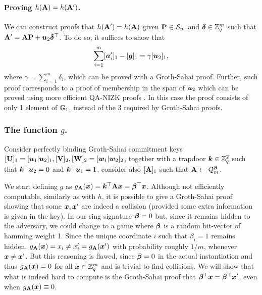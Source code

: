 \paragraph{Proving $h(\mathbf{{A}})=h(\mathbf{{A}}')$.} We can construct proofs that $h(\mathbf{{A}}') = h(\mathbf{{A}})$ given $\mathbf{{P}}\in\mathcal{S}_m$ and ${\boldsymbol{\delta}}\in\mathbb{Z}_q^m$ such that $\mathbf{{A}}' = \mathbf{{A}}\mathbf{{P}}+{\boldsymbol{u}}_2{\boldsymbol{\delta}}^\top$. To do so, it suffices to show that
\begin{equation}
\sum_{i=1}^{m}[{\boldsymbol{a}}'_i]_1 - [{\boldsymbol{g}}]_1 = \gamma[{\boldsymbol{u}}_2]_1,
\label{eq:coll-h}
\end{equation}
where $\gamma = \sum_{i=1}^m \delta_i$,
which can be proved with a Groth-Sahai proof. Further, such proof corresponds to a proof of membership in the span of ${\boldsymbol{u}}_2$ which can be proved using more efficient QA-NIZK proofs \cite{C:JutRoy14,EC:KilWee15}. In this case the proof consists of only 1 element of $\mathbb{G}_1$, instead of the $3$ required by Groth-Sahai proofs.

\subsubsection{The function $g$.} Consider perfectly binding Groth-Sahai commitment keys $[\mathbf{{U}}]_1=[{\boldsymbol{u}}_1|{\boldsymbol{u}}_2]_1,[\mathbf{{V}}]_2,[\mathbf{{W}}]_2 = [{\boldsymbol{w}}_1|{\boldsymbol{w}}_2]_2$, together with a trapdoor ${\boldsymbol{k}}\in\mathbb{Z}_q^2$ such that ${\boldsymbol{k}}^\top{\boldsymbol{u}}_2=0$ and ${\boldsymbol{k}}^\top{\boldsymbol{u}}_1=1$, consider also $[\mathbf{{A}}]_1$ such that $\mathbf{{A}}\gets\mathcal{Q}_m^{\boldsymbol{\beta}}$.

We start defining $g$ as $g_{\mathbf{{A}}}({\boldsymbol{x}}) = {\boldsymbol{k}}^\top\mathbf{{A}}{\boldsymbol{x}} = {\boldsymbol{\beta}}^\top{\boldsymbol{x}}$. Although not efficiently computable, similarly as with $h$, it is possible to give a Groth-Sahai proof showing that some ${\boldsymbol{x}},{\boldsymbol{x}}'$ are indeed a collision (provided some extra information is given in the key).
In our ring signature ${\boldsymbol{\beta}}=0$ but, since it remains hidden to the adversary, we could change to a game where ${\boldsymbol{\beta}}$ is a random bit-vector of hamming weight 1. Since the unique coordinate $i$ such that $\beta_i=1$ remains hidden, $g_{\mathbf{{A}}}({\boldsymbol{x}}) = x_i \neq x'_i =g_{\mathbf{{A}}}({\boldsymbol{x}}')$ with probability roughly $1/m$, whenever ${\boldsymbol{x}}\neq{\boldsymbol{x}}'$. But this reasoning is flawed, since ${\boldsymbol{\beta}}=0$ in the actual instantiation and thus $g_{\mathbf{{A}}}({\boldsymbol{x}}) = 0$ for all ${\boldsymbol{x}}\in\mathbb{Z}_q^m$ and is trivial to find collisions.
We will show that what is indeed hard to compute is the Groth-Sahai proof that ${\boldsymbol{\beta}}^\top{\boldsymbol{x}} = {\boldsymbol{\beta}}^\top{\boldsymbol{x}}'$, even when $g_{\mathbf{{A}}}({\boldsymbol{x}})\equiv 0$.

